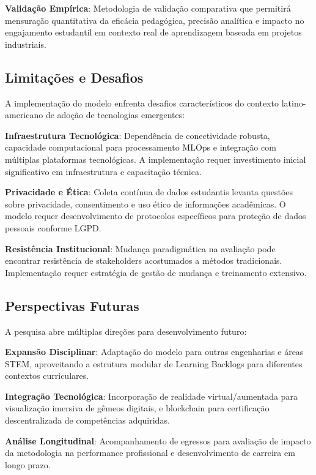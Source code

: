 \documentclass[english, spanish, brazilian]{RBIEarticle} %
\begin{document}
\textbf{Validação Empírica}: Metodologia de validação comparativa que permitirá mensuração quantitativa da eficácia pedagógica, precisão analítica e impacto no engajamento estudantil em contexto real de aprendizagem baseada em projetos industriais.

\subsection{Limitações e Desafios}

\indent

A implementação do modelo enfrenta desafios característicos do contexto
latino-americano de adoção de tecnologias emergentes:

\textbf{Infraestrutura Tecnológica}: Dependência de conectividade robusta, capacidade computacional para processamento MLOps e integração com múltiplas plataformas tecnológicas. A implementação requer investimento inicial significativo em infraestrutura e capacitação técnica.

\textbf{Privacidade e Ética}: Coleta contínua de dados estudantis levanta questões sobre privacidade, consentimento e uso ético de informações acadêmicas. O modelo requer desenvolvimento de protocolos específicos para proteção de dados pessoais conforme LGPD.

\textbf{Resistência Institucional}: Mudança paradigmática na avaliação pode encontrar resistência de stakeholders acostumados a métodos tradicionais. Implementação requer estratégia de gestão de mudança e treinamento extensivo.

\subsection{Perspectivas Futuras}

\indent

A pesquisa abre múltiplas direções para desenvolvimento futuro:

\textbf{Expansão Disciplinar}: Adaptação do modelo para outras engenharias e áreas STEM, aproveitando a estrutura modular de Learning Backlogs para diferentes contextos curriculares.

\textbf{Integração Tecnológica}: Incorporação de realidade virtual/aumentada para visualização imersiva de gêmeos digitais, e blockchain para certificação descentralizada de competências adquiridas.

\textbf{Análise Longitudinal}: Acompanhamento de egressos para avaliação de impacto da metodologia na performance profissional e desenvolvimento de carreira em longo prazo.
\end{document}
